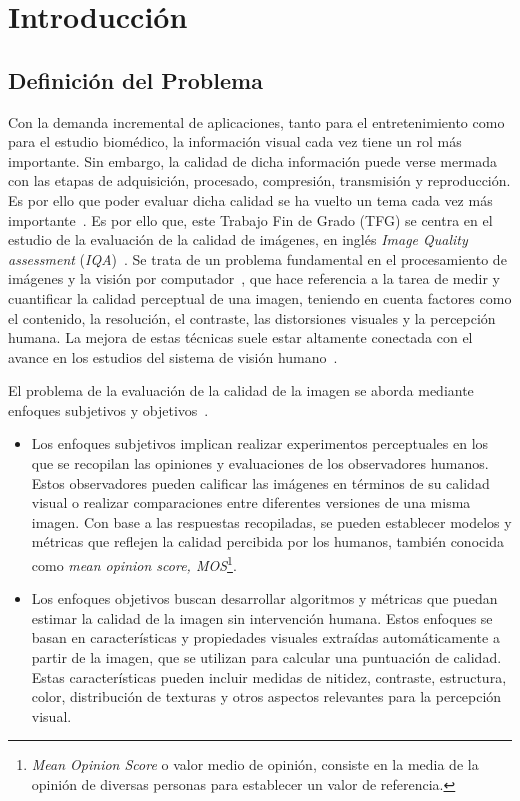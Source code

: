 \chapter{Introducción}
\section{Definición del Problema}   
Con la demanda incremental de aplicaciones, tanto para el entretenimiento 
como para el estudio biomédico, la información visual cada vez tiene un rol 
más importante. Sin embargo, la calidad de dicha información puede 
verse mermada con las etapas de adquisición, procesado, compresión, transmisión y reproducción.
Es por ello que poder evaluar dicha calidad se ha vuelto un 
tema cada vez más importante~\cite{RecentIQASurvey, IQABook, VisualMedicalQualityBook}.
Es por ello que, este Trabajo Fin de Grado (TFG) se centra en el estudio de la 
evaluación de la calidad de imágenes,
en inglés \emph{Image Quality assessment} (\emph{IQA})~\cite{MinkowskiFailure}.
Se trata de un problema fundamental en el procesamiento de imágenes y la visión 
por computador~\cite{CVAlgorithms,CVGeometry,CVModern,CVProcessing}, que hace referencia a la tarea de medir y cuantificar 
la calidad perceptual de una imagen, 
teniendo en cuenta factores como el contenido, la resolución, 
el contraste, las distorsiones visuales y la percepción humana. 
La mejora de estas técnicas suele estar altamente conectada con el avance 
en los estudios del sistema de visión humano~\cite{Wang2006ModernIQ}.
 
El problema de la evaluación de la calidad de la imagen se aborda mediante enfoques 
subjetivos y objetivos~\cite{Wang2006ModernIQ}.
\begin{itemize}
  \item Los enfoques subjetivos implican realizar experimentos 
perceptuales en los que se recopilan las opiniones y evaluaciones de los observadores 
humanos. Estos observadores pueden calificar las imágenes en términos de su 
calidad visual o realizar comparaciones entre diferentes versiones de una misma imagen. 
Con base a las respuestas recopiladas, se pueden establecer modelos y 
métricas que reflejen la calidad percibida por los humanos, también conocida
como \emph{mean opinion score, MOS}\footnote{
\emph{Mean Opinion Score} o valor medio de opinión, consiste en 
la media de la opinión de diversas personas para establecer un valor de referencia. 
}.
\item Los enfoques objetivos buscan desarrollar algoritmos y métricas 
que puedan estimar la calidad de la imagen sin intervención humana. 
Estos enfoques se basan en características y propiedades visuales extraídas automáticamente a partir de la 
imagen, que se utilizan para calcular una puntuación de calidad. Estas características 
pueden incluir medidas de nitidez, contraste, estructura, color, distribución de 
texturas y otros aspectos relevantes para la percepción visual.
\end{itemize}
 

